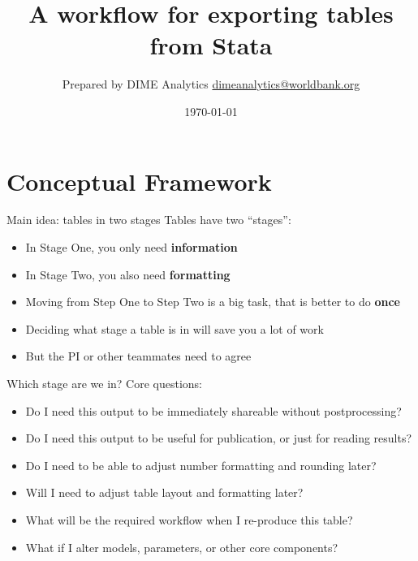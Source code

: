 \documentclass[aspectratio=169]{beamer}
\title{A workflow for exporting tables from Stata}
\date{\today}
\author{Prepared by DIME Analytics \newline \url{dimeanalytics@worldbank.org}}
\institute{Presented by: \newline Luiza Cardoso de Andrade (\url{lcardoso@worldbank.org}) \newline Benjamin Daniels (\url{bdaniels@worldbank.org})}
\begin{document}
\maketitle

\section{Conceptual Framework}

\begin{frame}[fragile]{Main idea: tables in two stages}
Tables have two ``stages'':
\begin{itemize}
    \item In Stage One, you only need \textbf{information}
    \item In Stage Two, you also need \textbf{formatting}
    \item Moving from Step One to Step Two is a big task, that is better to do \textbf{once}
    \item Deciding what stage a table is in will save you a lot of work
    \item But the PI or other teammates need to agree
\end{itemize}
\end{frame}

\begin{frame}[fragile]{Which stage are we in?}
Core questions:
\begin{itemize}
    \item Do I need this output to be immediately shareable without postprocessing?
    \item Do I need this output to be useful for publication, or just for reading results?
    \item Do I need to be able to adjust number formatting and rounding later?
    \item Will I need to adjust table layout and formatting later?
    \item What will be the required workflow when I re-produce this table?
    \item What if I alter models, parameters, or other core components?
\end{itemize}
\end{frame}
\end{document}
